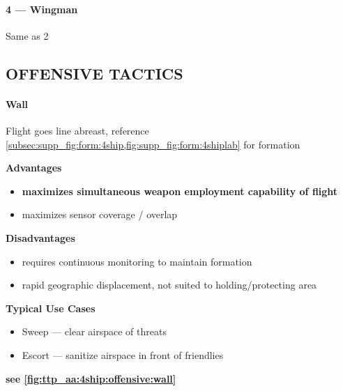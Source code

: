 \paragraph{4 --- Wingman}
Same as 2


\clearpage

\subsection{OFFENSIVE TACTICS}

\paragraph{Wall}
Flight goes line abreast, 
reference \cref{subsec:supp_fig:form:4ship,fig:supp_fig:form:4shiplab}
for formation

\begin{multicols}{2}
    \textbf{Advantages}
    \begin{itemize}
        \item \textbf{maximizes simultaneous weapon employment capability of flight}
        \item maximizes sensor coverage / overlap
    \end{itemize}
    \columnbreak
    \textbf{Disadvantages}
    \begin{itemize}
        \item requires continuous monitoring to maintain formation
        \item rapid geographic displacement, 
        not suited to holding/protecting area
    \end{itemize}
\end{multicols}

\textbf{Typical Use Cases}
\begin{itemize}
    \item Sweep --- clear airspace of threats
    \item Escort --- sanitize airspace in front of friendlies
\end{itemize}
\hfill\textbf{see \cref{fig:ttp_aa:4ship:offensive:wall}}

